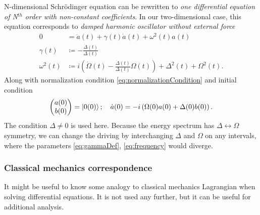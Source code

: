 N-dimensional Schr\"odinger equation can be rewritten to \emph{one differential equation of N$^{th}$ order with non-constant coefficients}. In our two-dimensional case, this equation corresponds to \emph{damped harmonic oscillator without external force}
\begin{align}
    0&= \ddot a(t)+ \gamma(t) \dot a(t)+\omega^2(t)a(t) \label{eq:harmonicOscillator}\\
    \gamma(t)&\coloneqq -\frac{\dot \Delta(t)}{\Delta(t)} \label{eq:gammaDef}\\
    \omega^2(t) &\coloneqq i\left(\dot \Omega(t)-\frac{\dot\Delta(t)}{\Delta(t)}\Omega(t)\right)+\Delta^2(t)+\Omega^2(t).
    \label{eq:frequency}
\end{align}
Along with normalization condition \ref{eq:normalizationCondition} and initial condition
\begin{equation}
    \begin{pmatrix}
        a(0)\\b(0)
    \end{pmatrix}=\ket{0(0)}; \quad \dot a(0)=-i\left(\Omega(0) a(0)+\Delta(0)b(0)\right).
\end{equation}
The condition $\Delta\neq 0$ is used here. Because the energy spectrum has $\Delta\leftrightarrow \Omega$ symmetry, we can change the driving by interchanging $\Delta$ and $\Omega$ on any intervals, where the parameters \ref{eq:gammaDef}, \ref{eq:frequency} would diverge.


\subsubsection{Classical mechanics correspondence}
It might be useful to know some analogy to classical mechanics Lagrangian when solving differential equations. It is not used any further, but it can be useful for additional analysis.

